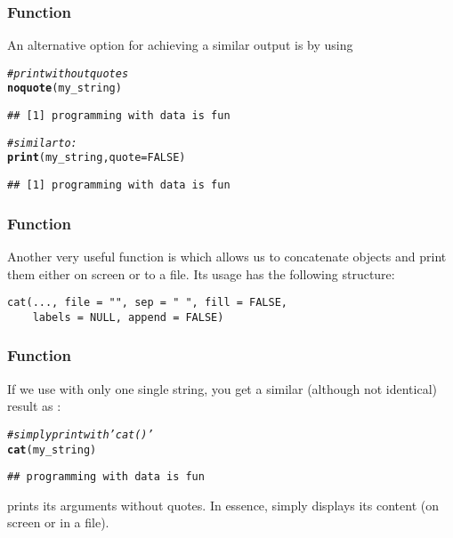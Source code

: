\documentclass[12pt]{beamer}\usepackage[]{graphicx}\usepackage[]{color}
\makeatletter
\newcommand{\hlnum}[1]{\textcolor[rgb]{0.686,0.059,0.569}{#1}}%
\newcommand{\hlcom}[1]{\textcolor[rgb]{0.678,0.584,0.686}{\textit{#1}}}%
\newcommand{\hlstd}[1]{\textcolor[rgb]{0.345,0.345,0.345}{#1}}%
\newcommand{\hlkwc}[1]{\textcolor[rgb]{0.333,0.667,0.333}{#1}}%
\newcommand{\hlkwd}[1]{\textcolor[rgb]{0.737,0.353,0.396}{\textbf{#1}}}%
\newenvironment{kframe}{%
 \def\at@end@of@kframe{}%
 \ifinner\ifhmode%
  \def\at@end@of@kframe{\end{minipage}}%
  \begin{minipage}{\columnwidth}%
 \fi\fi%
 \def\FrameCommand##1{\hskip\@totalleftmargin \hskip-\fboxsep
 \colorbox{shadecolor}{##1}\hskip-\fboxsep
     \hskip-\linewidth \hskip-\@totalleftmargin \hskip\columnwidth}%
 \MakeFramed {\advance\hsize-\width
   \@totalleftmargin\z@ \linewidth\hsize
   \@setminipage}}%
 {\par\unskip\endMakeFramed%
 \at@end@of@kframe}
\newenvironment{knitrout}{}{} %
\makeatother
\begin{document}
\begin{frame}[fragile]
\frametitle{Function }

An alternative option for achieving a similar output is by using 
\begin{knitrout}\footnotesize
{}\color{fgcolor}\begin{kframe}
\begin{alltt}
\hlcom{# print without quotes}
\hlkwd{noquote}\hlstd{(my_string)}
\end{alltt}
\begin{verbatim}
## [1] programming with data is fun
\end{verbatim}
\begin{alltt}
\hlcom{# similar to:}
\hlkwd{print}\hlstd{(my_string,} \hlkwc{quote} \hlstd{=} \hlnum{FALSE}\hlstd{)}
\end{alltt}
\begin{verbatim}
## [1] programming with data is fun
\end{verbatim}
\end{kframe}
\end{knitrout}

\end{frame}


\begin{frame}[fragile]
\frametitle{Function }

Another very useful function is {\hilit {}} which allows us to concatenate objects and print them either on screen or to a file. Its usage has the following structure:
\begin{verbatim}
cat(..., file = "", sep = " ", fill = FALSE, 
    labels = NULL, append = FALSE)
\end{verbatim}

\end{frame}


\begin{frame}[fragile]
\frametitle{Function }

If we use  with only one single string, you get a similar (although not identical) result as :
\begin{knitrout}\footnotesize
{}\color{fgcolor}\begin{kframe}
\begin{alltt}
\hlcom{# simply print with 'cat()'}
\hlkwd{cat}\hlstd{(my_string)}
\end{alltt}
\begin{verbatim}
## programming with data is fun
\end{verbatim}
\end{kframe}
\end{knitrout}

 prints its arguments without quotes. In essence,  simply displays its content (on screen or in a file).

\end{frame}
\end{document}
